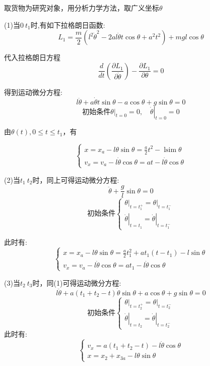 \documentclass{cumcmthesis}
\begin{document}
取货物为研究对象，用分析力学方法，取广义坐标$\theta$

(1)当$0~t_1$时,有如下拉格朗日函数:
$$L_{1}=\frac{m}{2}\left(l^{2} \dot{\theta}^{2}-2 a l \dot{\theta} t \cos \theta+a^{2} t^{2}\right)+m gl\cos \theta$$

代入拉格朗日方程$$\frac{d}{d t}\left(\frac{\partial L_{1}}{\partial \dot{\theta}}\right)-\frac{\partial L_1}{\partial \theta}=0$$

得到运动微分方程:$$l \ddot{\theta}+a \dot{\theta} t \sin \theta-a \cos \theta+g \sin \theta=0$$
$$\text{初始条件}\left.\theta\right|_{t=0}=0,\left.\quad \dot{\theta}\right|_{t=0}=0$$

由$\theta(t),0 \leqslant t \leqslant t_{1}$，有

$$\left\{\begin{array}{l}
        x=x_{a}-l \theta \sin \theta=\frac{a}{2} t^{2}-\operatorname{lsim} \theta \\
        v_{x}=v_{a}-l \dot{\theta} \cos \theta=a t-l \dot{\theta} \cos \theta
    \end{array}\right.$$

(2)当$t_1~t_2$时，同上可得运动微分方程:
$$\ddot{\theta}+\frac{g}{l} \sin \theta=0$$
$$\text{初始条件}\left \{\begin{array}{l}
        \left.\theta\right|_{t=t_{1}^{+}}=\left.\theta\right|_{t=t_{1}^{-}} \\
        \left.\dot{\theta}\right|_{t=t_{1}}=\left.\dot{\theta}\right|_{t=t_{1}^{-}}
    \end{array}\right.$$

此时有:$$\left\{\begin{array}{l}
        x=x_{a}-l\theta \sin \theta=\frac{a}{2} t_{1}^{2}+at_1(t-t_1)-l\sin \theta \\
        v_{x}=v_{a}-l \dot{\theta} \cos \theta=a t_{1}-l\dot{\theta }\cos \theta
    \end{array}\right.$$

(3)当$t_2~t_3$时，同(1)可得运动微分方程:
$$l \ddot{\theta}+a\left(t_{1}+t_{2}-t\right) \dot{\theta} \sin \theta+a \cos \theta+g \sin \theta=0$$
$$\text{初始条件}\left \{\begin{array}{l}
        \left.\theta\right|_{t=t_{2}^{+}}=\left.\theta\right|_{t=t_{2}^{-}} \\
        \left.\dot{\theta}\right|_{t=t_{2}}=\left.\dot{\theta}\right|_{t=t_{2}^{-}}
    \end{array}\right.$$
此时有:$$\left\{\begin{array}{l}
        v_{x}=a\left(t_{1}+t_{2}-t\right)-l \dot{ \theta} \cos \theta \\
        x=x_{2}+x_{3 a}-l\theta \sin\theta
    \end{array}\right.$$
\end{document}
